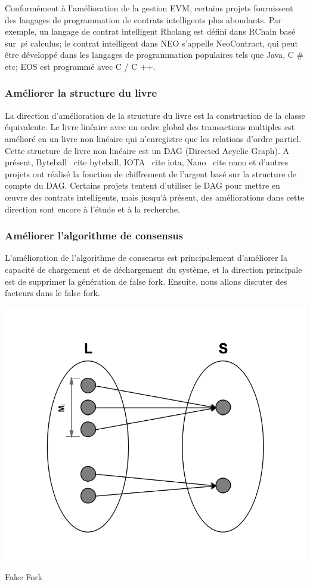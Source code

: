\documentclass[UTF8,nofonts]{article}
\makeatletter
\newenvironment{figurehere}
 {\def\@captype{figure}}
 {}
\makeatother
\begin{document}
\begin{multicols}{2}
Conformément à l'amélioration de la gestion EVM, certains projets fournissent des langages de programmation de contrats intelligents plus abondants. Par exemple, un langage de contrat intelligent Rholang est défini dans RChain basé sur $ \ pi $ calculus; le contrat intelligent dans NEO s'appelle NeoContract, qui peut être développé dans les langages de programmation populaires tels que Java, C \# etc; EOS est programmé avec C / C ++.

\subsubsection{Améliorer la structure du livre}
La direction d'amélioration de la structure du livre est la construction de la classe équivalente. Le livre linéaire avec un ordre global des transactions multiples est amélioré en un livre non linéaire qui n'enregistre que les relations d'ordre partiel.
Cette structure de livre non linéaire est un DAG (Directed Acyclic Graph). A présent, Byteball \ cite {byteball}, IOTA \ cite {iota}, Nano \ cite {nano} et d'autres projets ont réalisé la fonction de chiffrement de l'argent basé sur la structure de compte du DAG. Certains projets tentent d'utiliser le DAG pour mettre en œuvre des contrats intelligents, mais jusqu'à présent, des améliorations dans cette direction sont encore  à l'étude et à la recherche.

\subsubsection{Améliorer l'algorithme de consensus}
L'amélioration de l'algorithme de consensus est principalement d'améliorer la capacité de chargement et de déchargement du système, et la direction principale est de supprimer la génération de false fork. Ensuite, nous allons discuter des facteurs dans le false fork.

\begin{center}
\begin{figurehere}
\includegraphics[width=.7\linewidth]{image/falsefork.png}
\caption{ False Fork}
\end{figurehere}
\end{center}


\end{multicols}
\end{document}
